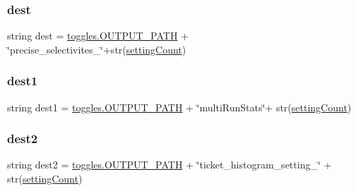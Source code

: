 \mbox{\label{classdynamicfilterapp_1_1test__simulations_1_1_simulation_test_a66d4da94e0e4f717ff3e7f23c53f7c2d}} 
\subsubsection{\texorpdfstring{dest}{dest}}
{\footnotesize\ttfamily string dest = \mbox{\hyperlink{namespacedynamicfilterapp_1_1toggles_a04644ded1d5e3fc8bd58a411209b7886}{toggles.\+O\+U\+T\+P\+U\+T\+\_\+\+P\+A\+TH}} + \char`\"{}precise\+\_\+selectivites\+\_\+\char`\"{}+str(\mbox{\hyperlink{classdynamicfilterapp_1_1test__simulations_1_1_simulation_test_a18e9dc3d267483ccc2dbacf54439c5ff}{setting\+Count}})\hspace{0.3cm}{\ttfamily [static]}}

\mbox{\label{classdynamicfilterapp_1_1test__simulations_1_1_simulation_test_a378bd708ce64c9205a9d5b7ef5179008}} 
\subsubsection{\texorpdfstring{dest1}{dest1}}
{\footnotesize\ttfamily string dest1 = \mbox{\hyperlink{namespacedynamicfilterapp_1_1toggles_a04644ded1d5e3fc8bd58a411209b7886}{toggles.\+O\+U\+T\+P\+U\+T\+\_\+\+P\+A\+TH}} + \char`\"{}multi\+Run\+Stats\char`\"{}+ str(\mbox{\hyperlink{classdynamicfilterapp_1_1test__simulations_1_1_simulation_test_a18e9dc3d267483ccc2dbacf54439c5ff}{setting\+Count}})\hspace{0.3cm}{\ttfamily [static]}}

\mbox{\label{classdynamicfilterapp_1_1test__simulations_1_1_simulation_test_a55df54097e78f89cfbea1eac42c38c6c}} 
\subsubsection{\texorpdfstring{dest2}{dest2}}
{\footnotesize\ttfamily string dest2 = \mbox{\hyperlink{namespacedynamicfilterapp_1_1toggles_a04644ded1d5e3fc8bd58a411209b7886}{toggles.\+O\+U\+T\+P\+U\+T\+\_\+\+P\+A\+TH}} + \char`\"{}ticket\+\_\+histogram\+\_\+setting\+\_\+\char`\"{} + str(\mbox{\hyperlink{classdynamicfilterapp_1_1test__simulations_1_1_simulation_test_a18e9dc3d267483ccc2dbacf54439c5ff}{setting\+Count}})\hspace{0.3cm}{\ttfamily [static]}}

